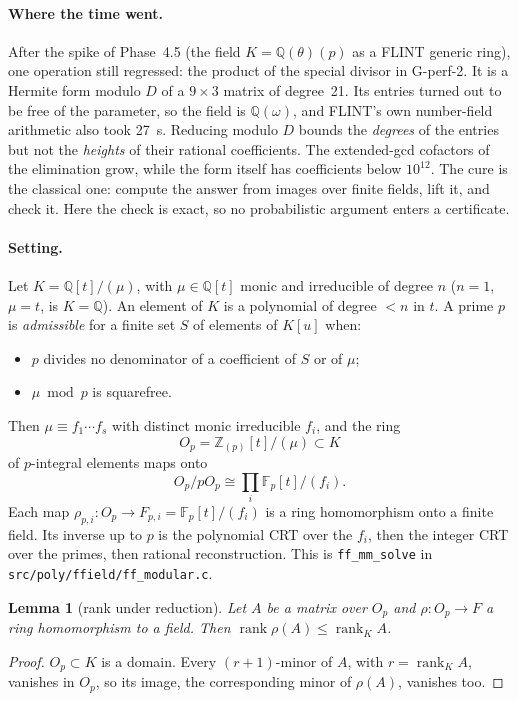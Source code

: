 \documentclass[11pt]{article}
\newtheorem{lemma}[theorem]{Lemma}
\theoremstyle{definition}
\theoremstyle{remark}
\newcommand{\Q}{\mathbb{Q}}
\newcommand{\Z}{\mathbb{Z}}
\newcommand{\code}[1]{\texttt{#1}}
\begin{document}
\paragraph{Where the time went.} After the spike of Phase~4.5 (the field
$K=\Q(\theta)(p)$ as a FLINT generic ring), one operation still regressed: the
product of the special divisor in G-perf-2. It is a Hermite form modulo $D$ of a
$9\times3$ matrix of degree~21. Its entries turned out to be free of the
parameter, so the field is $\Q(\omega)$, and FLINT's own number-field arithmetic
also took 27~s. Reducing modulo $D$ bounds the \emph{degrees} of the entries but
not the \emph{heights} of their rational coefficients. The extended-gcd cofactors
of the elimination grow, while the form itself has coefficients below $10^{12}$.
The cure is the classical one: compute the answer from images over finite fields,
lift it, and check it. Here the check is exact, so no probabilistic argument
enters a certificate.

\paragraph{Setting.} Let $K=\Q[t]/(\mu)$, with $\mu\in\Q[t]$ monic and irreducible
of degree $n$ ($n=1$, $\mu=t$, is $K=\Q$). An element of $K$ is a polynomial of
degree $<n$ in $t$. A prime $p$ is \emph{admissible} for a finite set $S$ of
elements of $K[u]$ when:
\begin{itemize}
\item $p$ divides no denominator of a coefficient of $S$ or of $\mu$;
\item $\mu \bmod p$ is squarefree.
\end{itemize}
Then $\mu\equiv f_1\cdots f_s$ with distinct monic irreducible $f_i$, and the ring
\[
  O_p=\Z_{(p)}[t]/(\mu)\subset K
\]
of $p$-integral elements maps onto
\[
  O_p/pO_p\cong\prod_i\mathbb F_p[t]/(f_i).
\]
Each map $\rho_{p,i}\colon O_p\to F_{p,i}=\mathbb F_p[t]/(f_i)$ is a ring
homomorphism onto a finite field. Its inverse up to $p$ is the polynomial CRT over
the $f_i$, then the integer CRT over the primes, then rational reconstruction.
This is \code{ff\_mm\_solve} in \code{src/poly/ffield/ff\_modular.c}.

\begin{lemma}[rank under reduction]\label{lem:E7rank}
Let $A$ be a matrix over $O_p$ and $\rho\colon O_p\to F$ a ring homomorphism to a
field. Then $\operatorname{rank}\rho(A)\le\operatorname{rank}_K A$.
\end{lemma}
\begin{proof}
$O_p\subset K$ is a domain. Every $(r+1)$-minor of $A$, with $r=\operatorname{rank}_K A$,
vanishes in $O_p$, so its image, the corresponding minor of $\rho(A)$, vanishes too.
\end{proof}
\end{document}
